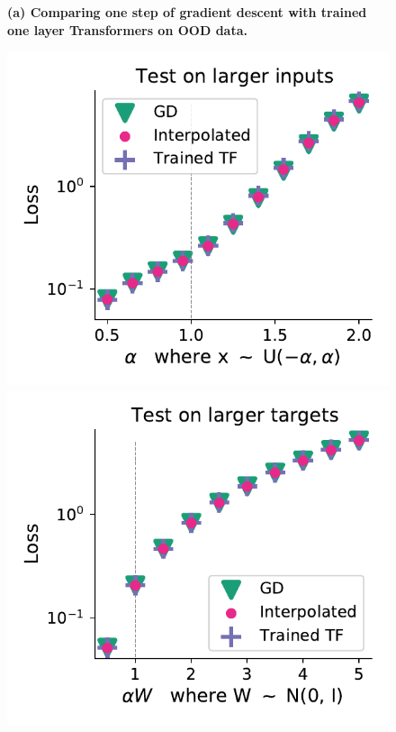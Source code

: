 \documentclass{article}
\theoremstyle{plain}
\theoremstyle{definition}
\theoremstyle{remark}
\begin{document}
\begin{figure}
\textbf{(a) Comparing one step of gradient descent with trained one layer Transformers on OOD data.}
\begin{center}
\begin{minipage}{.24\textwidth}
  \centering
  \begin{center}
    \includegraphics[width=1.\textwidth]{Final_figures/linear/linear_one_layer_one_head_0_002/normal.pdf}
  \end{center}
  \vspace{-10pt}
\end{minipage}
\begin{minipage}{.24\textwidth}
  \centering
  \begin{center}
    \includegraphics[width=1.\textwidth]{Final_figures/linear/linear_one_layer_one_head_0_002/normal_6.pdf}

\end{center}
\end{minipage}
\end{center}
\end{figure}
\end{document}
